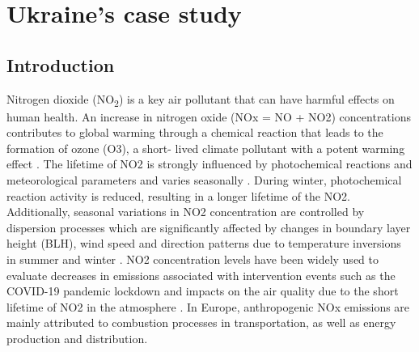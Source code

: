 \chapter{Ukraine's case study}
\section{Introduction}
Nitrogen dioxide (NO\textsubscript{2}) is a key air pollutant that can have harmful effects on human health. An increase in nitrogen oxide (NOx = NO + NO2) concentrations contributes to global warming through a chemical reaction that leads to the formation of ozone (O3), a short- lived climate pollutant with a potent warming effect \citep{ipcc2013}. The lifetime of NO2 is strongly influenced by photochemical reactions and meteorological parameters \citep{barre2021estimating} and varies seasonally \citep{dragomir2015modeling,kendrick2015diurnal}. During winter, photochemical reaction activity is reduced, resulting in a longer lifetime of the NO2. Additionally, seasonal variations in NO2 concentration are controlled by dispersion processes which are significantly affected by changes in boundary layer height (BLH), wind speed and direction patterns due to temperature inversions in summer and winter \citep{barre2021estimating,kendrick2015diurnal}. NO2 concentration levels have been widely used to evaluate decreases in emissions associated with intervention events such as the COVID-19 pandemic lockdown and impacts on the air quality due to the short lifetime of NO2 in the atmosphere \citep{barre2021estimating,cooper2022global}.
In Europe, anthropogenic NOx emissions are mainly attributed to combustion processes in transportation, as well as energy production and distribution. \par
